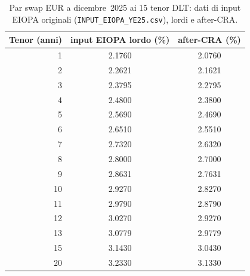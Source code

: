 \begin{table}[H]\centering\small
\caption{Par swap EUR a dicembre~2025 ai 15 tenor DLT: dati di input EIOPA originali (\texttt{INPUT\_EIOPA\_YE25.csv}), lordi e after-CRA.}
\label{tab:input-ye25-dic}\renewcommand{\arraystretch}{1.15}
\begin{tabular}{rcc}
\toprule
\textbf{Tenor} (anni) & input EIOPA lordo (\%) & after-CRA (\%)\\
\midrule
1 & 2.1760 & 2.0760\\
2 & 2.2621 & 2.1621\\
3 & 2.3795 & 2.2795\\
4 & 2.4800 & 2.3800\\
5 & 2.5690 & 2.4690\\
6 & 2.6510 & 2.5510\\
7 & 2.7320 & 2.6320\\
8 & 2.8000 & 2.7000\\
9 & 2.8631 & 2.7631\\
10 & 2.9270 & 2.8270\\
11 & 2.9790 & 2.8790\\
12 & 3.0270 & 2.9270\\
13 & 3.0779 & 2.9779\\
15 & 3.1430 & 3.0430\\
20 & 3.2330 & 3.1330\\
\bottomrule
\end{tabular}
\end{table}
